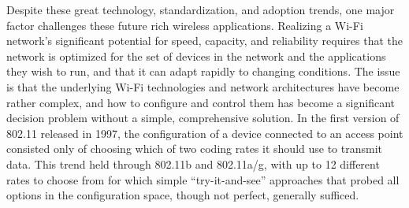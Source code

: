 %


Despite these great technology, standardization, and adoption trends, one major factor challenges these future rich wireless applications. Realizing a Wi-Fi network's significant potential for speed, capacity, and reliability requires that the network is optimized for the set of devices in the network and the applications they wish to run, and that it can adapt rapidly to changing conditions. The issue is that the underlying Wi-Fi technologies and network architectures have become rather complex, and how to configure and control them has become a significant decision problem without a simple, comprehensive solution. In the first version of 802.11 released in 1997, the configuration of a device connected to an access point consisted only of choosing which of two coding rates it should use to transmit data. This trend held through 802.11b and 802.11a/g, with up to 12 different rates to choose from for which simple ``try-it-and-see'' approaches that probed all options in the configuration space, though not perfect, generally sufficed.

